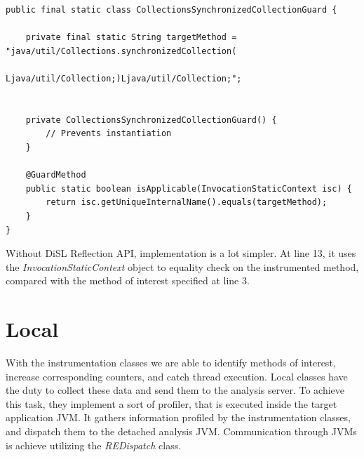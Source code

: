 \documentclass[]{usiinfthesis}
\begin{document}
\vspace*{0.5cm}
\begin{verbatim}
public final static class CollectionsSynchronizedCollectionGuard {

    private final static String targetMethod = "java/util/Collections.synchronizedCollection(
                                                      Ljava/util/Collection;)Ljava/util/Collection;";


    private CollectionsSynchronizedCollectionGuard() {
        // Prevents instantiation
    }

    @GuardMethod
    public static boolean isApplicable(InvocationStaticContext isc) {
        return isc.getUniqueInternalName().equals(targetMethod);
    }
}
\end{verbatim}
\vspace*{0.5cm}
Without DiSL Reflection API, implementation is a lot simpler. At line 13, it uses the \textit{InvocationStaticContext} object to equality check on the instrumented method, compared with the method of interest specified at line 3.


\section{Local}
With the instrumentation classes we are able to identify methods of interest, increase corresponding counters, and catch thread execution. Local classes have the duty to collect these data and send them to the analysis server. To achieve this task, they implement a sort of profiler, that is executed inside the target application JVM. It gathers information profiled by the instrumentation classes, and dispatch them to the detached analysis JVM. Communication through JVMs is achieve utilizing the \textit{REDispatch} class. 
\end{document}
